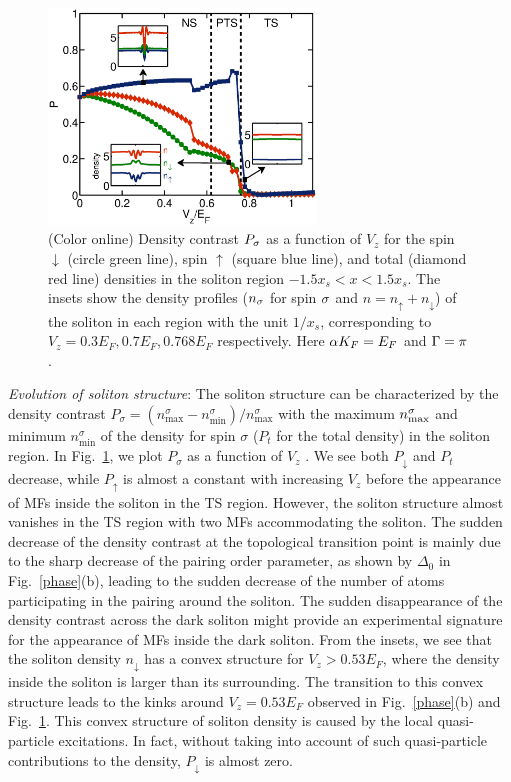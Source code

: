 \documentclass[prl,aps,twocolumn,showpacs, floatfix]{revtex4}
\begin{document}
\begin{figure}[t]
\includegraphics[width=2.8in]{density_contrast3.eps}
\caption{(Color online) Density contrast $P_{\protect\sigma }$ as a function
of $V_{z}$ for the spin $\downarrow $ (circle green line), spin $\uparrow $
(square blue line), and total (diamond red line) densities in the soliton
region $-1.5x_{s}<x<1.5x_{s}$. The insets show the density profiles ($n_{%
\protect\sigma }$ for spin $\protect\sigma $ and $n=n_{\uparrow
}+n_{\downarrow }$) of the soliton in each region with the unit $1/x_{s}$,
corresponding to $V_{z}=0.3E_{F},0.7E_{F},0.768E_{F}$ respectively. Here $%
\protect\alpha K_{F}=E_{F}$ and $\Gamma =\protect\pi $.}
\label{density_constrast}
\end{figure}

\emph{Evolution of soliton structure}: The soliton structure can be
characterized by the density contrast $P_{\sigma }=(n_{\text{max}}^{\sigma
}-n_{\text{min}}^{\sigma })/n_{\text{max}}^{\sigma }$ with the maximum $n_{%
\text{max}}^{\sigma }$ and minimum $n_{\text{min}}^{\sigma }$ of the density
for spin $\sigma $ ($P_{t}$ for the total density) in the soliton region. In
Fig.~\ref{density_constrast}, we plot $P_{\sigma }$ as a function of $V_{z}$%
. We see both $P_{\downarrow }$ and $P_{t}$ decrease, while $P_{\uparrow }$
is almost a constant with increasing $V_{z}$ before the appearance of MFs
inside the soliton in the TS region. However, the soliton structure almost
vanishes in the TS region with two MFs accommodating the soliton. The sudden
decrease of the density contrast at the topological transition point is
mainly due to the sharp decrease of the pairing order parameter, as shown by
$\Delta _{0}$ in Fig.~\ref{phase}(b), leading to the sudden decrease of the
number of atoms participating in the pairing around the soliton. The sudden
disappearance of the density contrast across the dark soliton might provide
an experimental signature for the appearance of MFs inside the dark soliton.
From the insets, we see that the soliton density $n_{\downarrow }$ has a
convex structure for $V_{z}>0.53E_{F}$, where the density inside the soliton
is larger than its surrounding. The transition to this convex structure
leads to the kinks around $V_{z}=0.53E_{F}$ observed in Fig.~\ref{phase}(b)
and Fig.~\ref{density_constrast}. This convex structure of soliton density
is caused by the local quasi-particle excitations. In fact, without taking
into account of such quasi-particle contributions to the density, $%
P_{\downarrow }$ is almost zero.
\end{document}
